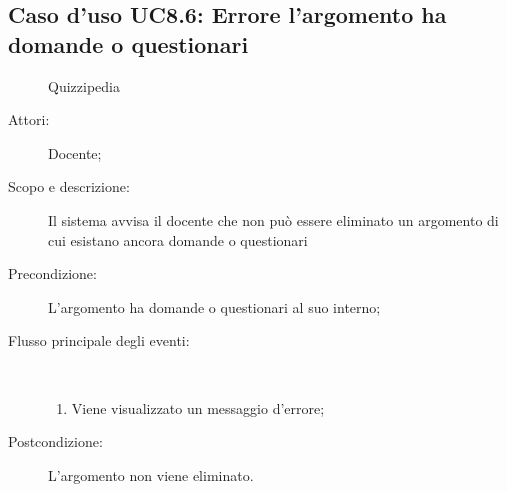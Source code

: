 \subsection{Caso d'uso UC8.6: Errore l'argomento ha domande o questionari}
	\begin{figure}[H]
		\centering
		\begin{resizedtikzpicture}{\textwidth}
		\begin{umlsystem}[x=0, fill=lightgray!20]{Quizzipedia}
		\end{umlsystem}
		\end{resizedtikzpicture}
		\caption{}
	\end{figure}
\begin{description}
\item[Attori:] Docente;
\item[Scopo e descrizione:] Il sistema avvisa il docente che non può essere eliminato un argomento di cui esistano ancora domande o questionari
      \item[Precondizione:] L'argomento ha domande o questionari al suo interno;

        \item[Flusso principale degli eventi:] \ 
 \begin{enumerate}
          \item Viene visualizzato un messaggio d'errore;

      \end{enumerate}
    \item[Postcondizione:] L'argomento non viene eliminato.
  \end{description}
\hypertarget{UC9}{}
